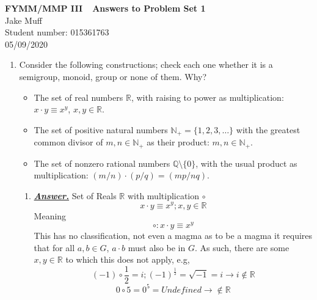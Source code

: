 \documentclass[12pt]{article}
\newcommand{\R} {\mathbb{R}}
\newcommand{\N} {\mathbb{N}}
\newcommand{\Q} {\mathbb{Q}}
\begin{document}
\normalsize

\baselineskip 14pt

\begin{center}
     {\Large {\bf FYMM/MMP III\ \  Answers to Problem Set 1}}\\
     {\large { Jake Muff}}\\
     {Student number: 015361763}\\
     {05/09/2020}
     \end{center}

\noindent

\begin{enumerate}
\item Consider the following constructions; check each one whether it is a semigroup, monoid, group or
none of them. Why?
\begin{itemize}
\item The set of real numbers $\R$, with raising to power as multiplication:
$x\cdot y \equiv x^y$, $x,y\in \R$.
\item The set of positive natural numbers $\N_+=\{1,2,3,\ldots \}$ with the greatest common
divisor of $m,n\in \N_+$ as their product: $m,n\in \N_+$.
\item The set of nonzero rational numbers $\Q\setminus\{0\}$, with the usual product
as multiplication: $(m/n) \cdot (p/q)
= (mp/nq)$.
\end{itemize}

\begin{enumerate}
     \item \underline{\textbf{\emph{Answer.}}} Set of Reals $\R$ with multiplication $\circ$
     $$ x \cdot y \equiv x^{y}; x,y \in \R$$
     Meaning $$ \circ : x \cdot y \equiv x^{y} $$
     This has no classification, not even a magma as to be a magma it requires that for all $a,b \in G$, $a \cdot b$ must also be in $G$.
     As such, there are some $x,y \in \R$ to which this does not apply, e.g, 
     $$ (-1) \circ \frac{1}{2} = i;  (-1)^{\frac{1}{2}} = \sqrt{-1} = i \rightarrow i \notin \R $$
     $$ 0 \circ 5 = 0^5 = Undefined \rightarrow \notin \R $$


\end{enumerate}
\end{enumerate}
\end{document}
